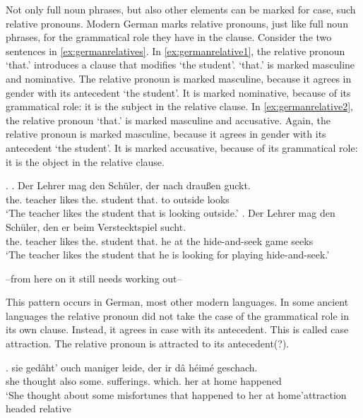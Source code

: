Not only full noun phrases, but also other elements can be marked for case, such relative pronouns. Modern German marks relative pronouns, just like full noun phrases, for the grammatical role they have in the clause. Consider the two sentences in \ref{ex:germanrelatives}. In \ref{ex:germanrelative1}, the relative pronoun  `that.' introduces a clause that modifies  `the student'.  `that.' is marked masculine and nominative. The relative pronoun is marked masculine, because it agrees in gender with its antecedent  `the student'. It is marked nominative, because of its grammatical role: it is the subject in the relative clause.
In \ref{ex:germanrelative2}, the relative pronoun  `that.' is marked masculine and accusative. Again, the relative pronoun is marked masculine, because it agrees in gender with its antecedent  `the student'. It is marked accusative, because of its grammatical role: it is the object in the relative clause.

\ex.\label{ex:germanrelatives}
\ag. Der Lehrer mag den Schüler, der nach draußen guckt.\\
 the. teacher likes the. student that. to outside looks\\
 `The teacher likes the student that is looking outside.'\label{ex:germanrelative1}
 \bg. Der Lehrer mag den Schüler, den er beim Verstecktspiel sucht.\\
 the. teacher likes the. student that. he {at the} {hide-and-seek game} seeks\\
 `The teacher likes the student that he is looking for playing hide-and-seek.'\label{ex:germanrelative2}

--from here on it still needs working out--

This pattern occurs in German, most other modern languages. In some ancient languages the relative pronoun did not take the case of the grammatical role in its own clause. Instead, it agrees in case with its antecedent. This is called case attraction. The relative pronoun is attracted to its antecedent(?).

\exg. sie gedâht' ouch maniger leide, der ir dâ héimé geschach.\\
she thought also some. sufferings. which. her at home happened\\
`She thought about some misfortunes that happened to her at home'\hfill attraction headed relative

